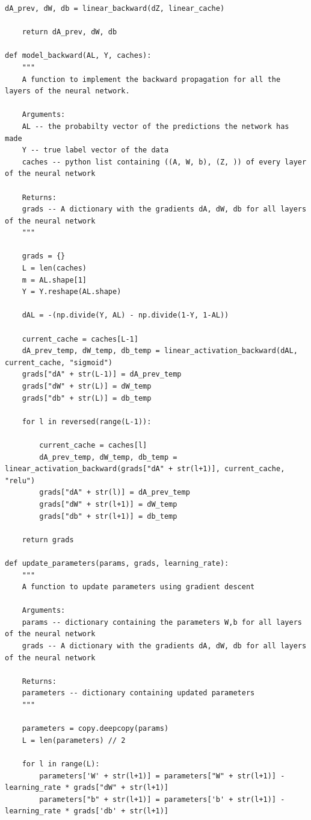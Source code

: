 \documentclass{article}
\begin{document}
\begin{lstlisting}[caption={Neural network functions - NN\_helper\_functions.py}]
    dA_prev, dW, db = linear_backward(dZ, linear_cache)

    return dA_prev, dW, db

def model_backward(AL, Y, caches):
    """
    A function to implement the backward propagation for all the layers of the neural network.

    Arguments:
    AL -- the probabilty vector of the predictions the network has made
    Y -- true label vector of the data
    caches -- python list containing ((A, W, b), (Z, )) of every layer of the neural network

    Returns:
    grads -- A dictionary with the gradients dA, dW, db for all layers of the neural network
    """

    grads = {}
    L = len(caches)
    m = AL.shape[1]
    Y = Y.reshape(AL.shape)

    dAL = -(np.divide(Y, AL) - np.divide(1-Y, 1-AL))

    current_cache = caches[L-1]
    dA_prev_temp, dW_temp, db_temp = linear_activation_backward(dAL, current_cache, "sigmoid")
    grads["dA" + str(L-1)] = dA_prev_temp
    grads["dW" + str(L)] = dW_temp
    grads["db" + str(L)] = db_temp

    for l in reversed(range(L-1)):

        current_cache = caches[l]
        dA_prev_temp, dW_temp, db_temp = linear_activation_backward(grads["dA" + str(l+1)], current_cache, "relu")
        grads["dA" + str(l)] = dA_prev_temp
        grads["dW" + str(l+1)] = dW_temp
        grads["db" + str(l+1)] = db_temp
    
    return grads

def update_parameters(params, grads, learning_rate):
    """
    A function to update parameters using gradient descent

    Arguments:
    params -- dictionary containing the parameters W,b for all layers of the neural network
    grads -- A dictionary with the gradients dA, dW, db for all layers of the neural network

    Returns:
    parameters -- dictionary containing updated parameters
    """

    parameters = copy.deepcopy(params)
    L = len(parameters) // 2

    for l in range(L):
        parameters['W' + str(l+1)] = parameters["W" + str(l+1)] - learning_rate * grads["dW" + str(l+1)]
        parameters["b" + str(l+1)] = parameters['b' + str(l+1)] - learning_rate * grads['db' + str(l+1)]


\end{lstlisting}
\end{document}
